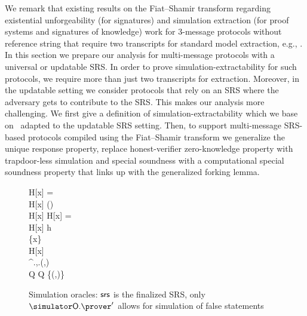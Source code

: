 We remark that existing results on the Fiat--Shamir transform regarding existential
unforgeability (for signatures) and simulation extraction (for proof systems and
signatures of knowledge) work for $3$-message protocols without reference string that
require two transcripts for standard model extraction, e.g.,
\cite{JC:PoiSte00,INDOCRYPT:FKMV12,C:RotSeg21}.  In this section we prepare our
analysis for multi-message protocols with a universal or updatable SRS.  In order to
prove simulation-extractability for such protocols, we require more than just two
transcripts for extraction.  Moreover, in the updatable setting we consider protocols
that rely on an SRS where the adversary gets to contribute to the SRS. This makes our
analysis more challenging.  We first give a definition of simulation-extractability
which we base on~\cite{INDOCRYPT:FKMV12} adapted to the updatable SRS setting. Then,
to support multi-message SRS-based protocols compiled using the Fiat--Shamir transform
we generalize the unique response property, replace honest-verifier zero-knowledge
property with trapdoor-less simulation and special soundness with a computational special
soundness property that links up with the generalized forking lemma.
\fi

\begin{figure}
	\centering
		\begin{pcvstack}
		\begin{pchstack}
			{
			\pcif H[x] = \bot \pcthen \\
			\pcind H[x] \sample {}(\ro) \\
			\pcreturn H[x]
			  }
			\pchspace
			{ 
				\pcif H[x] = \bot \pcthen \\ 
				\pcind H[x] \gets h \\
				\pcind \Qprog \gets \Qprog \cup \{x\}\\
				\pcreturn H[x]
			}
			\pchspace
			{ 
				\boxed{\pcassert (\inp,\wit)\in \REL} \\ 
				\pi \gets \simulator^{\simulator\oracleo.\ro,\simulator\oracleo.\prog}(\srs,\inp)\\
				Q \gets Q \cup \{(\inp,\pi)\}\\
				\pcreturn \pi
			}
		\end{pchstack}
	\end{pcvstack}
	\caption{Simulation oracles: $\mathsf{srs}$ is the finalized SRS, only $\simulator\oracleo.\prover'$ allows for simulation of false statements}
	\label{fig:real_simulator_oracles}
\end{figure}

